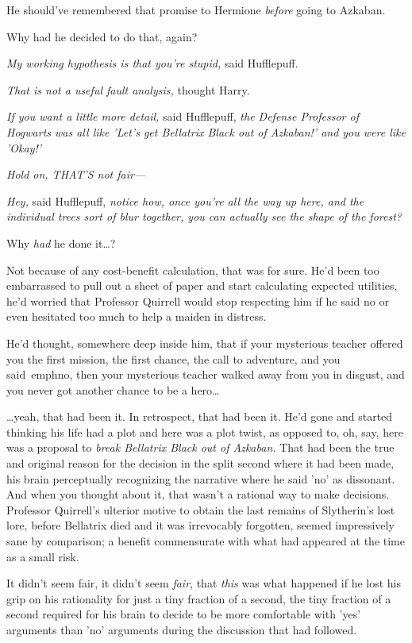 He should've remembered that promise to Hermione \emph{before} going to Azkaban.

Why had he decided to do that, again?

\emph{My working hypothesis is that you're stupid,} said Hufflepuff.

\emph{That is not a useful fault analysis,} thought Harry.

\emph{If you want a little more detail,} said Hufflepuff, \emph{the Defense 
Professor of Hogwarts was all like 'Let's get Bellatrix Black out of Azkaban!' 
and you were like 'Okay!'}

\emph{Hold on, THAT'S not fair---}

\emph{Hey,} said Hufflepuff, \emph{notice how, once you're all the way up here, 
and the individual trees sort of blur together, you can actually see the shape 
of the forest?}

Why \emph{had} he done it{\ldots}?

Not because of any cost-benefit calculation, that was for sure. He'd been too 
embarrassed to pull out a sheet of paper and start calculating expected 
utilities, he'd worried that Professor Quirrell would stop respecting him if he 
said no or even hesitated too much to help a maiden in distress.

He'd thought, somewhere deep inside him, that if your mysterious teacher 
offered you the first mission, the first chance, the call to adventure, and you 
said\ emph{no}, then your mysterious teacher walked away from you in disgust, 
and you never got another chance to be a hero{\ldots}

{\ldots}yeah, that had been it. In retrospect, that had been it. He'd gone and 
started thinking his life had a plot and here was a plot twist, as opposed to, 
oh, say, here was a proposal to \emph{break Bellatrix Black out of Azkaban.} 
That had been the true and original reason for the decision in the split second 
where it had been made, his brain perceptually recognizing the narrative where 
he said 'no' as dissonant. And when you thought about it, that wasn't a 
rational way to make decisions. Professor Quirrell's ulterior motive to obtain 
the last remains of Slytherin's lost lore, before Bellatrix died and it was 
irrevocably forgotten, seemed impressively sane by comparison; a benefit 
commensurate with what had appeared at the time as a small risk.

It didn't seem fair, it didn't seem \emph{fair}, that \emph{this} was what 
happened if he lost his grip on his rationality for just a tiny fraction of a 
second, the tiny fraction of a second required for his brain to decide to be 
more comfortable with 'yes' arguments than 'no' arguments during the discussion 
that had followed.

